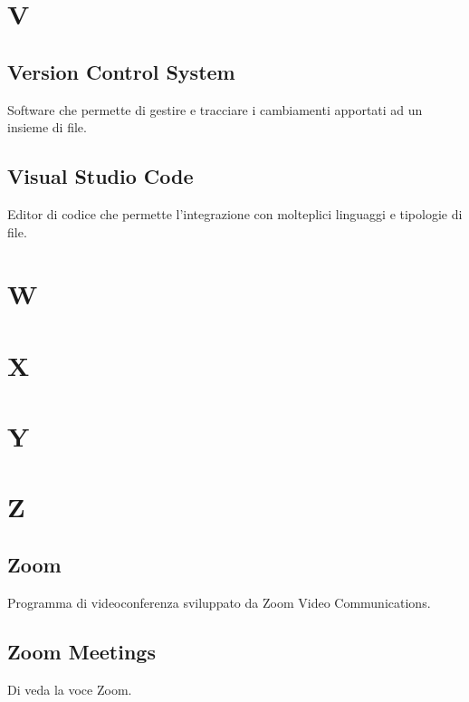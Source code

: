 \section{V}
\subsection{Version Control System}
Software che permette di gestire e tracciare i cambiamenti apportati ad un insieme di file.
\subsection{Visual Studio Code}
Editor di codice che permette l'integrazione con molteplici linguaggi e tipologie di file.
\section{W}
\section{X}
\section{Y}
\section{Z}
\subsection{Zoom}
Programma di videoconferenza sviluppato da Zoom Video Communications.
\subsection{Zoom Meetings}
Di veda la voce Zoom.

